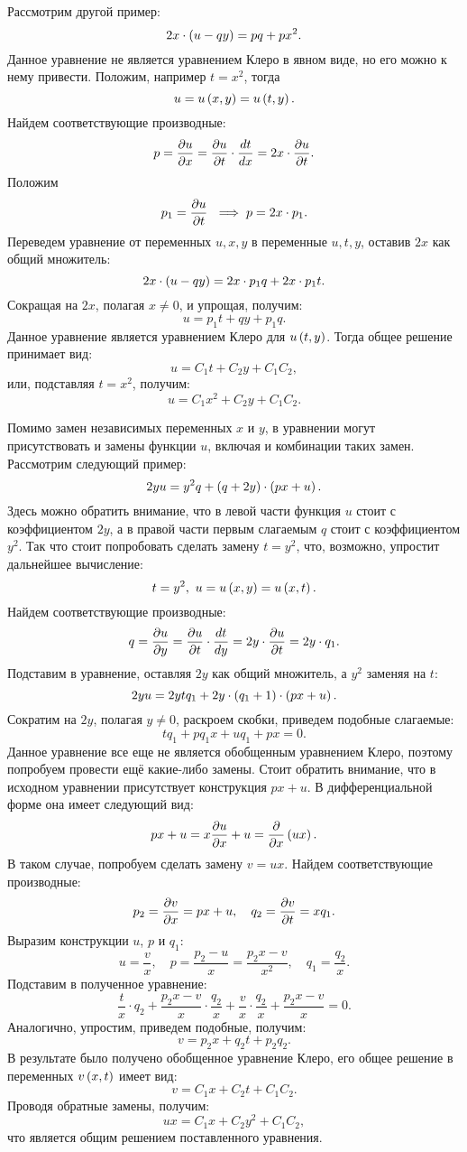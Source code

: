 		Рассмотрим другой пример:
		\[ 2x \cdot \left( u - qy \right) = pq + px^2. \]
		Данное уравнение не является уравнением Клеро в явном виде, но его можно к нему привести. Положим, например $t = x^2$, тогда
		\[ u = u \left( x, y \right) = u \left( t, y \right). \]
		Найдем соответствующие производные:
		\[ p = \dfrac{\partial u}{\partial x} = \dfrac{\partial u}{\partial t} \cdot \dfrac{d t}{d x} = 2x \cdot \dfrac{\partial u}{\partial t}. \]
		Положим
		\[ p_1 = \dfrac{\partial u}{\partial t} ~ \implies p = 2x \cdot p_1. \]
		Переведем уравнение от переменных $u, x, y$ в переменные $u, t, y$, оставив $2x$ как общий множитель:
		\[ 2 x \cdot \left( u - qy \right) = 2 x \cdot p_1 q + 2 x \cdot p_1 t. \]
		Сокращая на $2 x$, полагая $x \neq 0$, и упрощая, получим:
		\[ u = p_1 t + qy + p_1 q. \]
		Данное уравнение является уравнением Клеро для $u \left( t, y \right)$. Тогда общее решение принимает вид:
		\[ u = C_1 t + C_2 y + C_1 C_2, \]
		или, подставляя $t = x^2$, получим:
		\[ u = C_1 x^2 + C_2 y + C_1 C_2. \]

		\vspace{30pt}

		Помимо замен независимых переменных $x$ и $y$, в уравнении могут присутствовать и замены функции $u$, включая и комбинации таких замен. Рассмотрим следующий пример:
		\[ 2y u = y^2 q + \left( q + 2y \right) \cdot \left( p x + u \right). \]
		Здесь можно обратить внимание, что в левой части функция $u$ стоит с коэффициентом $2y$, а в правой части первым слагаемым $q$ стоит с коэффициентом $y^2$. Так что стоит попробовать сделать замену $t = y^2$, что, возможно, упростит дальнейшее вычисление:
		\[ t = y^2, ~ u = u \left( x, y \right) = u \left( x, t \right). \]
		Найдем соответствующие производные:
		\[ q = \dfrac{\partial u}{\partial y} = \dfrac{\partial u}{\partial t} \cdot \dfrac{d t}{d y} = 2y \cdot \dfrac{\partial u}{\partial t} = 2y \cdot q_1. \]
		Подставим в уравнение, оставляя $2y$ как общий множитель, а $y^2$ заменяя на $t$:
		\[ 2y u = 2y t q_1 + 2y \cdot \left( q_1 + 1 \right) \cdot \left( px + u \right). \]
		Сократим на $2y$, полагая $y \neq 0$, раскроем скобки, приведем подобные слагаемые:
		\[ t q_1 + p q_1 x + u q_1 + px = 0. \]
		Данное уравнение все еще не является обобщенным уравнением Клеро, поэтому попробуем провести ещё какие-либо замены. Стоит обратить внимание, что в исходном уравнении присутствует конструкция $px + u$. В дифференциальной форме она имеет следующий вид:
		\[ px + u = x \dfrac{\partial u}{\partial x} + u = \dfrac{\partial }{\partial x} \left( ux \right). \]
		В таком случае, попробуем сделать замену $v = ux$. Найдем соответствующие производные:
		\[ p_2 = \dfrac{\partial v}{\partial x} = px + u, \quad q_2 = \dfrac{\partial v}{\partial t} = x q_1. \]
		Выразим конструкции $u$, $p$ и $q_1$:
		\[ u = \frac{v}{x}, \quad p = \frac{p_2 - u}{x} = \frac{p_2x - v}{x^2}, \quad q_1 = \frac{q_2}{x}. \]
		Подставим в полученное уравнение:
		\[ \frac{t}{x} \cdot q_2 + \frac{p_2x - v}{x} \cdot \frac{q_2}{x} + \frac{v}{x} \cdot \frac{q_2}{x} + \frac{p_2x - v}{x} = 0. \]
		Аналогично, упростим, приведем подобные, получим:
		\[ v = p_2 x + q_2 t + p_2 q_2. \]
		В результате было получено обобщенное уравнение Клеро, его общее решение в переменных $v \left( x, t \right)$ имеет вид:
		\[ v = C_1 x + C_2 t + C_1 C_2. \]
		Проводя обратные замены, получим:
		\[ ux = C_1 x + C_2 y^2 + C_1 C_2, \]
		что является общим решением поставленного уравнения.

